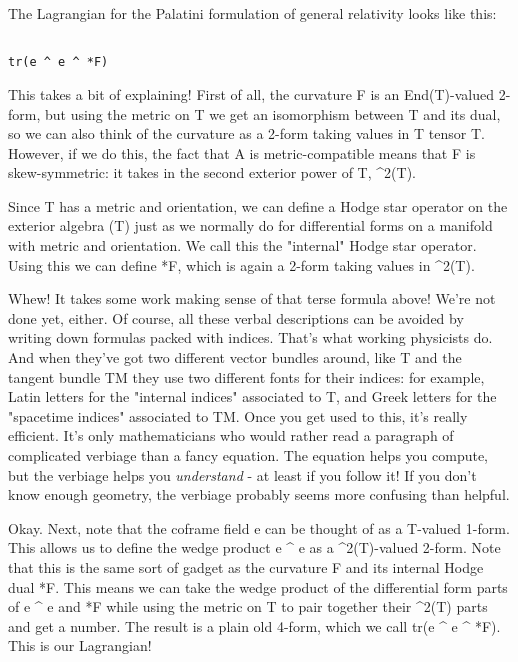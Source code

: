 The Lagrangian for the Palatini formulation of general relativity
looks like this:


\begin{verbatim}

tr(e ^ e ^ *F)
\end{verbatim}
    
This takes a bit of explaining!  First of all, the curvature F is an
End(T)-valued 2-form, but using the metric on T we get an isomorphism
between T and its dual, so we can also think of the curvature as a
2-form taking values in T tensor T.  However, if we do this, the fact
that A is metric-compatible means that F is skew-symmetric: it takes in
the second exterior power of T, \Lambda ^{2}(T).  

Since T has a metric and orientation, we can define a Hodge star
operator on the exterior algebra \Lambda (T) just as we normally do for
differential forms on a manifold with metric and orientation.  We call
this the "internal" Hodge star operator.  Using this we can 
define *F, which is again a 2-form taking values in \Lambda ^{2}(T).  

Whew!  It takes some work making sense of that terse formula above!
We're not done yet, either.  Of course, all these verbal descriptions
can be avoided by writing down formulas packed with indices. That's what
working physicists do.  And when they've got  two different vector
bundles around, like T and the tangent bundle TM they use two different
fonts for their indices: for example, Latin letters for the "internal
indices" associated to T, and Greek letters for the "spacetime indices"
associated to TM.  Once you get used to this, it's really efficient. 
It's only mathematicians who would rather read a paragraph of
complicated verbiage than a fancy equation.  The equation helps you
compute, but the verbiage helps you \emph{understand} - at least if you
follow it!  If you don't know enough geometry, the verbiage probably
seems more confusing than helpful.

Okay.  Next, note that the coframe field e can be thought of as a
T-valued 1-form.  This allows us to define the wedge product e ^ e as  
a \Lambda ^{2}(T)-valued 2-form.  Note that this is the same sort 
of gadget as the curvature F and its internal Hodge dual *F.  This means we can
take the wedge product of the differential form parts of e ^ e and *F
while  using the metric on T to pair together their \Lambda ^{2}(T) 
parts and get a number.  The result is a plain old 4-form, which we call 
tr(e ^ e ^ *F). This is our Lagrangian!

